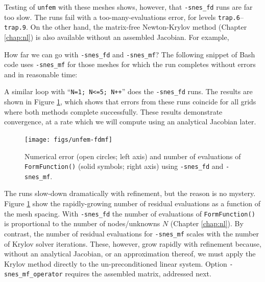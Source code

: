Testing of \texttt{unfem} with these meshes shows, however, that \texttt{-snes\_fd} runs are far too slow.  The runs fail with a too-many-evaluations error, for levels \texttt{trap.6}--\texttt{trap.9}.  On the other hand, the matrix-free Newton-Krylov method (Chapter \ref{chap:nl}) is also available without an assembled Jacobian.  For example, 

How far we can go with \texttt{-snes\_fd} and \texttt{-snes\_mf}?  The following snippet of Bash code uses \texttt{-snes\_mf} for those meshes for which the run completes without errors and in reasonable time:
A similar loop with ``\texttt{N=1; N<=5; N++}'' does the \texttt{-snes\_fd} runs.  The results are shown in Figure \ref{fig:un:unfem-fdmf}, which shows that errors from these runs coincide for all grids where both methods complete successfully.  These results demonstrate convergence, at a rate which we will compute using an analytical Jacobian later.

\begin{figure}
\texttt{[image: figs/unfem-fdmf]}
\caption{Numerical error (open circles; left axis) and number of evaluations of \texttt{FormFunction()} (solid symbols; right axis) using \texttt{-snes\_fd} and \texttt{-snes\_mf}.}
\label{fig:un:unfem-fdmf}
\end{figure}

The runs slow-down dramatically with refinement, but the reason is no mystery.  Figure \ref{fig:un:unfem-fdmf} show the rapidly-growing number of residual evaluations as a function of the mesh spacing.  With \texttt{-snes\_fd} the number of evaluations of \texttt{FormFunction()} is proportional to the number of nodes/unknowns $N$ (Chapter \ref{chap:nl}).  By contrast, the number of residual evaluations for \texttt{-snes\_mf} scales with the number of Krylov solver iterations.  These, however, grow rapidly with refinement because, without an analytical Jacobian, or an approximation thereof, we must apply the Krylov method directly to the un-preconditioned linear system.  Option \texttt{-snes\_mf\_operator} requires the assembled matrix, addressed next.


